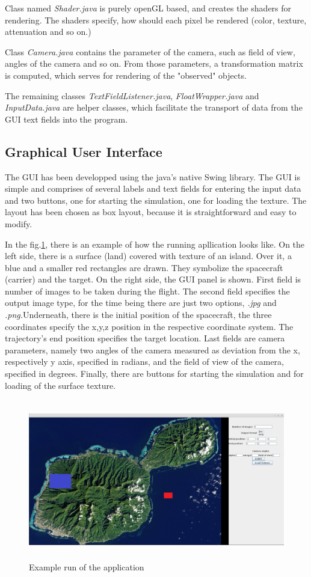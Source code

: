 \documentclass[english,12pt,a4paper,pdftex,elec,utf8]{aaltothesis}
\begin{document}
Class named \textit{Shader.java} is purely openGL based, and creates the shaders for rendering. The shaders specify, how should each pixel be rendered (color, texture, attenuation and so on.)

Class \textit{Camera.java} contains the parameter of the camera, such as field of view, angles of the camera and so on. From those parameters, a transformation matrix is computed, which serves for rendering of the "observed" objects.

The remaining classes \textit{TextFieldListener.java}, \textit{FloatWrapper.java} and \textit{InputData.java} are helper classes, which facilitate the transport of data from the GUI text fields into the program.

\subsection*{Graphical User Interface}

The GUI has been developped using the java's native Swing library. The GUI is simple and comprises of several labels and text fields for entering the input data and two buttons, one for starting the simulation, one for loading the texture. The layout has been chosen as box layout, because it is straightforward and easy to modify.

In the fig.\ref{GUIExample}, there is an example of how the running apllication looks like. On the left side, there is a surface (land) covered with texture of an island. Over it, a blue and a smaller red rectangles are drawn. They symbolize the spacecraft (carrier) and the target. On the right side, the GUI panel is shown. First field is number of images to be taken during the flight. The second field specifies the output image type, for the time being there are just two options, \textit{.jpg} and \textit{.png.}Underneath, there is the initial position of the spacecraft, the three coordinates specify the x,y,z position in the respective coordinate system. The trajectory's end position specifies the target location. Last fields are camera parameters, namely two angles of the camera measured as deviation from the x, respectively y axis, specified in radians, and the field of view of the camera, specified in degrees. Finally, there are buttons for starting the simulation and for loading of the surface texture.

\begin{figure}[htb]
\centering \includegraphics[height=7cm]{GUIExample.png}
\caption{Example run of the application\label{GUIExample}}
\end{figure}
\end{document}
